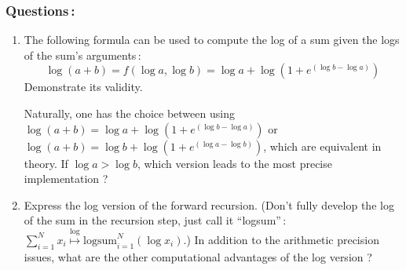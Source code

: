 \documentclass[twoside,a4paper,titlepage]{article}
\begin{document}
\subsubsection*{Questions\,:}
\begin{enumerate}
\item The following formula can be used to compute the log of a sum given
the logs of the sum's arguments\,:
\[
	\log(a+b) = f(\log a,\log b) = \log a + \log \left( 1 + e^{(\log b - \log a)} \right)
\]
%
Demonstrate its validity.

Naturally, one has the choice between using $\log(a+b) = \log a + \log
\left( 1 + e^{(\log b - \log a)} \right)$ or $\log(a+b) = \log b + \log
\left( 1 + e^{(\log a - \log b)} \right)$, which are equivalent in theory.
If $\log a > \log b$, which version leads to the most precise
implementation ?
\item Express the log version of the forward recursion. (Don't fully
develop the log of the sum in the recursion step, just call it
``logsum''\,: $\sum_{i=1}^{N} x_i \stackrel{\log}{\longmapsto} \mbox{logsum}_{i=1}^{N} ( \log
x_i )$.) In addition to the arithmetic precision issues, what are the other
computational advantages of the log version ?
\end{enumerate}
\end{document}
